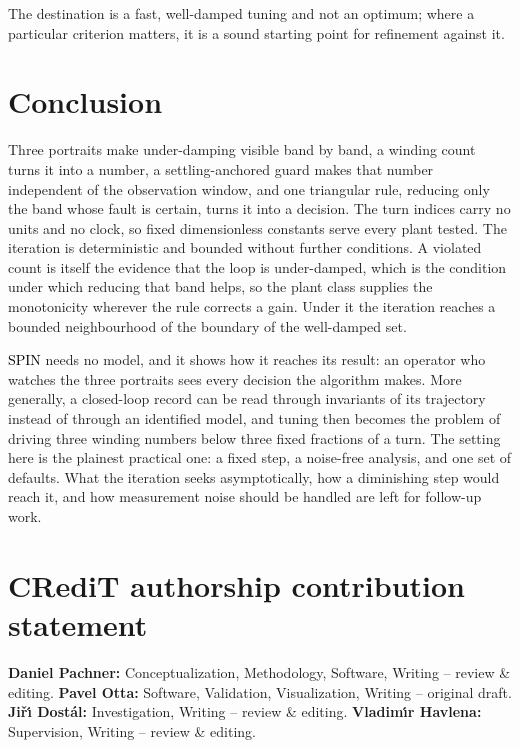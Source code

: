 \documentclass[final,3p,times,twocolumn]{elsarticle}
\newcommand{\spin}{SPIN\xspace}
\newcommand{\rev}[1]{#1}   %
\newcommand{\new}[1]{\textcolor{black}{#1}}  %
\begin{document}
The destination is a fast, well-damped tuning and not an optimum; where
a particular criterion matters, it is a sound starting point for
refinement against it.

\section{Conclusion}

Three portraits make under-damping visible band by band, a winding
count turns it into a number, a settling-anchored guard makes that
number independent of the observation window, and one triangular rule,
reducing only the band whose fault is certain, turns it into a
decision. The turn indices carry no units and no clock, so fixed
dimensionless constants serve every plant tested. The iteration is
deterministic and bounded without further conditions. A violated count
is itself the evidence that the loop is under-damped, which is the
condition under which reducing that band helps, so the plant class
supplies the monotonicity wherever the rule corrects a gain. Under it
the iteration reaches a bounded neighbourhood of the boundary of the
well-damped set.

\new{\spin} needs no model, and it shows how it reaches its result: an
operator who watches the three portraits sees every decision the
algorithm makes. More generally, a closed-loop record can be read
through invariants of its trajectory instead of through an identified
model, and tuning then becomes the problem of driving three winding
numbers below three fixed fractions of a turn. \rev{The setting here is
the plainest practical one: a fixed step, a noise-free analysis, and
one set of defaults. What the iteration seeks asymptotically, how a
diminishing step would reach it, and how measurement noise should be
handled are left for follow-up work.}

\section*{CRediT authorship contribution statement}
\textbf{Daniel Pachner:} Conceptualization, Methodology, Software,
Writing -- review \& editing. \textbf{Pavel Otta:} Software, Validation,
Visualization, Writing -- original draft. \textbf{Ji\v{r}\'{\i}
Dost\'al:} Investigation, Writing -- review \& editing.
\textbf{Vladim\'{\i}r Havlena:} Supervision, Writing -- review \&
editing.
\end{document}
